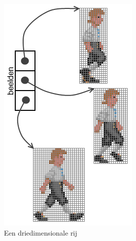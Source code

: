 \begin{figure}
\centering
\includegraphics[scale=0.8]{Rijen/rij3dim.png}
\caption{Een driedimensionale rij}\label{fig:rij3dim}
\end{figure}


